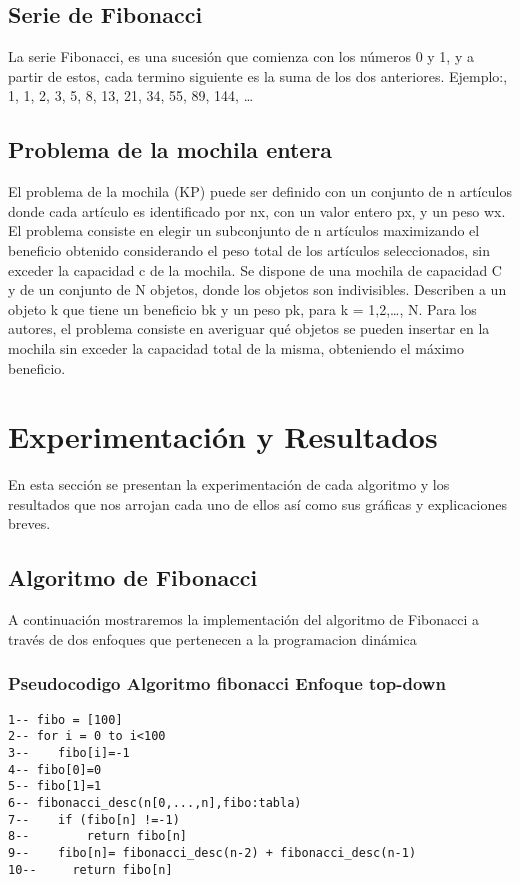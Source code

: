 \documentclass[12pt,twoside]{article}
\begin{document}
\subsection{Serie de Fibonacci}
La serie Fibonacci, es una sucesión que comienza  con los números 0 y 1, y a partir de estos, cada termino siguiente es la suma de los dos anteriores.\newline
Ejemplo:, 1, 1, 2, 3, 5, 8, 13, 21, 34, 55, 89, 144, …
\subsection{Problema de la mochila entera}
El problema de la mochila (KP) puede ser definido con un conjunto de n artículos donde cada artículo es identificado por nx, con un valor entero px, y un peso wx. El problema consiste en elegir un subconjunto de n artículos maximizando el beneficio obtenido considerando el peso total de los artículos seleccionados, sin exceder la capacidad c de la mochila.
Se dispone de una mochila de capacidad C y de un conjunto de N objetos, donde los objetos son indivisibles. Describen a un objeto k que tiene un beneficio bk y un peso pk, para k = 1,2,…, N. Para los autores, el problema consiste en averiguar qué objetos se pueden insertar en la mochila sin exceder la capacidad total de la misma, obteniendo el máximo beneficio.

\section{Experimentaci\'on y Resultados}
En esta sección se presentan la experimentación de cada algoritmo y los resultados que nos arrojan cada uno de ellos así como sus gráficas y explicaciones breves.

\subsection{Algoritmo de Fibonacci}
A continuación mostraremos la implementación del algoritmo de Fibonacci a través de dos enfoques que pertenecen a la programacion dinámica
\subsubsection{Pseudocodigo Algoritmo fibonacci Enfoque top-down}
\begin{lstlisting}
1-- fibo = [100]
2-- for i = 0 to i<100
3--    fibo[i]=-1
4-- fibo[0]=0
5-- fibo[1]=1
6-- fibonacci_desc(n[0,...,n],fibo:tabla)
7--    if (fibo[n] !=-1)
8--        return fibo[n]
9--    fibo[n]= fibonacci_desc(n-2) + fibonacci_desc(n-1)
10--     return fibo[n]
\end{lstlisting}
\end{document}
